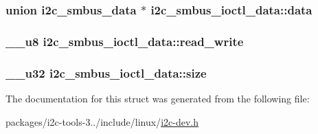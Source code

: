 \subsubsection[{data}]{\setlength{\rightskip}{0pt plus 5cm}union {\bf i2c\+\_\+smbus\+\_\+data} $\ast$ i2c\+\_\+smbus\+\_\+ioctl\+\_\+data\+::data}\label{structi2c__smbus__ioctl__data_a05e3efd596ce6ee38476d27cef6d6e73}
\hypertarget{structi2c__smbus__ioctl__data_a545643b68fb6ee6806aadc62f5c9a9b0}{}
\subsubsection[{read\+\_\+write}]{\setlength{\rightskip}{0pt plus 5cm}\+\_\+\+\_\+u8 i2c\+\_\+smbus\+\_\+ioctl\+\_\+data\+::read\+\_\+write}\label{structi2c__smbus__ioctl__data_a545643b68fb6ee6806aadc62f5c9a9b0}
\hypertarget{structi2c__smbus__ioctl__data_a8656ac3dfa404899f6549baea41cf342}{}
\subsubsection[{size}]{\setlength{\rightskip}{0pt plus 5cm}\+\_\+\+\_\+u32 i2c\+\_\+smbus\+\_\+ioctl\+\_\+data\+::size}\label{structi2c__smbus__ioctl__data_a8656ac3dfa404899f6549baea41cf342}


The documentation for this struct was generated from the following file\+:\begin{DoxyCompactItemize}
\item 
packages/i2c-\/tools-\/3../include/linux/\hyperlink{i2c-tools-3_81_81_2include_2linux_2i2c-dev_8h}{i2c-\/dev.\+h}\end{DoxyCompactItemize}
